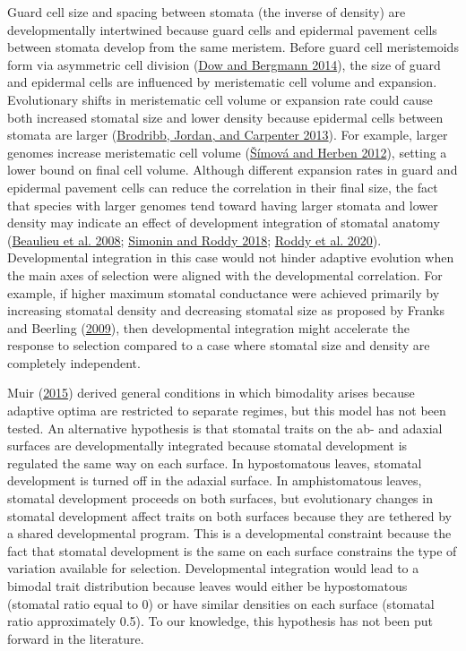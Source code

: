 \documentclass[
  12pt,
]{article}
\begin{document}
Guard cell size and spacing between stomata (the inverse of density) are developmentally intertwined because guard cells and epidermal pavement cells between stomata develop from the same meristem. Before guard cell meristemoids form via asymmetric cell division (\protect\hyperlink{ref-dow_patterning_2014}{Dow and Bergmann 2014}), the size of guard and epidermal cells are influenced by meristematic cell volume and expansion. Evolutionary shifts in meristematic cell volume or expansion rate could cause both increased stomatal size and lower density because epidermal cells between stomata are larger (\protect\hyperlink{ref-brodribb_unified_2013}{Brodribb, Jordan, and Carpenter 2013}). For example, larger genomes increase meristematic cell volume (\protect\hyperlink{ref-simova_geometrical_2012}{Šímová and Herben 2012}), setting a lower bound on final cell volume. Although different expansion rates in guard and epidermal pavement cells can reduce the correlation in their final size, the fact that species with larger genomes tend toward having larger stomata and lower density may indicate an effect of development integration of stomatal anatomy (\protect\hyperlink{ref-beaulieu_genome_2008}{Beaulieu et al. 2008}; \protect\hyperlink{ref-simonin_genome_2018}{Simonin and Roddy 2018}; \protect\hyperlink{ref-roddy_scaling_2020}{Roddy et al. 2020}). Developmental integration in this case would not hinder adaptive evolution when the main axes of selection were aligned with the developmental correlation. For example, if higher maximum stomatal conductance were achieved primarily by increasing stomatal density and decreasing stomatal size as proposed by Franks and Beerling (\protect\hyperlink{ref-franks_maximum_2009}{2009}), then developmental integration might accelerate the response to selection compared to a case where stomatal size and density are completely independent.

Muir (\protect\hyperlink{ref-muir_making_2015}{2015}) derived general conditions in which bimodality arises because adaptive optima are restricted to separate regimes, but this model has not been tested. An alternative hypothesis is that stomatal traits on the ab- and adaxial surfaces are developmentally integrated because stomatal development is regulated the same way on each surface. In hypostomatous leaves, stomatal development is turned off in the adaxial surface. In amphistomatous leaves, stomatal development proceeds on both surfaces, but evolutionary changes in stomatal development affect traits on both surfaces because they are tethered by a shared developmental program. This is a developmental constraint because the fact that stomatal development is the same on each surface constrains the type of variation available for selection. Developmental integration would lead to a bimodal trait distribution because leaves would either be hypostomatous (stomatal ratio equal to 0) or have similar densities on each surface (stomatal ratio approximately 0.5). To our knowledge, this hypothesis has not been put forward in the literature.
\end{document}
